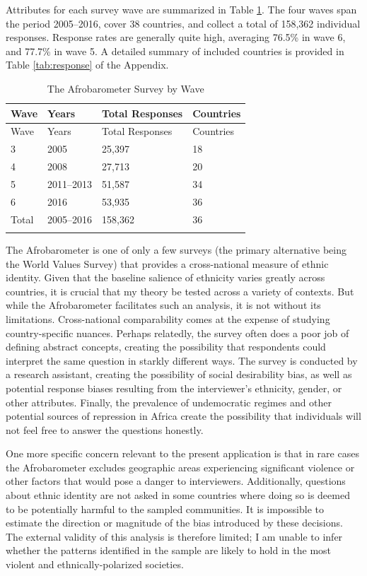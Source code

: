 \documentclass[12pt,]{book}
\theoremstyle{definition}
\theoremstyle{definition}
\theoremstyle{definition}
\theoremstyle{remark}
\begin{document}
Attributes for each survey wave are summarized in Table
\ref{tab:afro-topline}. The four waves span the period 2005--2016, cover
38 countries, and collect a total of 158,362 individual responses.
Response rates are generally quite high, averaging 76.5\% in wave 6, and
77.7\% in wave 5. A detailed summary of included countries is provided
in Table \ref{tab:response} of the Appendix.

\begin{longtable}[]{@{}llll@{}}
\tabularnewline
\toprule
Wave & Years & Total Responses & Countries\tabularnewline
\midrule
\endfirsthead
\toprule
Wave & Years & Total Responses & Countries\tabularnewline
\midrule
\endhead
3 & 2005 & 25,397 & 18\tabularnewline
4 & 2008 & 27,713 & 20\tabularnewline
5 & 2011--2013 & 51,587 & 34\tabularnewline
6 & 2016 & 53,935 & 36\tabularnewline
Total & 2005--2016 & 158,362 & 36\tabularnewline
\bottomrule
\caption{\label{tab:afro-topline} The Afrobarometer Survey by
Wave}
\end{longtable}

The Afrobarometer is one of only a few surveys (the primary alternative
being the World Values Survey) that provides a cross-national measure of
ethnic identity. Given that the baseline salience of ethnicity varies
greatly across countries, it is crucial that my theory be tested across
a variety of contexts. But while the Afrobarometer facilitates such an
analysis, it is not without its limitations. Cross-national
comparability comes at the expense of studying country-specific nuances.
Perhaps relatedly, the survey often does a poor job of defining abstract
concepts, creating the possibility that respondents could interpret the
same question in starkly different ways. The survey is conducted by a
research assistant, creating the possibility of social desirability
bias, as well as potential response biases resulting from the
interviewer's ethnicity, gender, or other attributes. Finally, the
prevalence of undemocratic regimes and other potential sources of
repression in Africa create the possibility that individuals will not
feel free to answer the questions honestly.

One more specific concern relevant to the present application is that in
rare cases the Afrobarometer excludes geographic areas experiencing
significant violence or other factors that would pose a danger to
interviewers. Additionally, questions about ethnic identity are not
asked in some countries where doing so is deemed to be potentially
harmful to the sampled communities. It is impossible to estimate the
direction or magnitude of the bias introduced by these decisions. The
external validity of this analysis is therefore limited; I am unable to
infer whether the patterns identified in the sample are likely to hold
in the most violent and ethnically-polarized societies.
\end{document}
